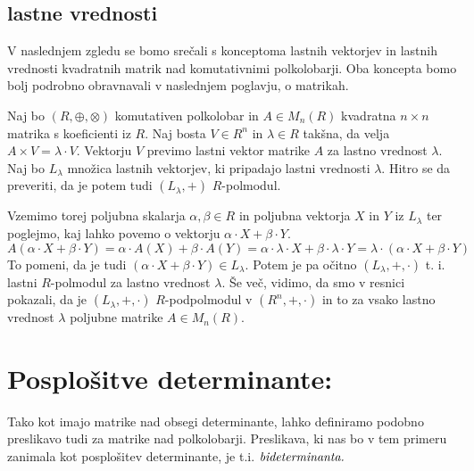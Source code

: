 \documentclass[mat1]{fmfdelo}
\newcommand{\pojem}[1]{\ensuremath{\emph{#1}}}
\begin{document}
\subsection{lastne vrednosti}
V naslednjem zgledu se bomo srečali s konceptoma lastnih vektorjev in lastnih vrednosti kvadratnih matrik nad komutativnimi polkolobarji. Oba koncepta bomo bolj podrobno obravnavali v naslednjem poglavju, o matrikah.
\begin{zgled}
	Naj bo $(R, \oplus, \otimes)$ komutativen polkolobar in $A\in M_n(R)$ kvadratna $n\times n$ matrika s koeficienti iz $R$. Naj bosta $V\in R^n$ in $\lambda\in R$ takšna, da velja $A \times V = \lambda \cdot V$. Vektorju $V$ previmo lastni vektor matrike $A$ za lastno vrednost $\lambda$. Naj bo $L_\lambda$ množica lastnih vektorjev, ki pripadajo lastni vrednosti $\lambda$. Hitro se da preveriti, da je potem tudi $(L_\lambda, +)$ $R$-polmodul.
	
	Vzemimo torej poljubna skalarja $\alpha, \beta\in R$ in poljubna vektorja $X$ in $Y$ iz $L_\lambda$ ter poglejmo, kaj lahko povemo o vektorju $\alpha\cdot X + \beta\cdot Y$. $$A(\alpha\cdot X + \beta\cdot Y) = \alpha\cdot A(X) + \beta\cdot A(Y) = \alpha\cdot\lambda\cdot X + \beta\cdot\lambda\cdot Y = \lambda\cdot (\alpha\cdot X + \beta\cdot Y)$$ To pomeni, da je tudi $(\alpha\cdot X + \beta\cdot Y)\in L_\lambda$. Potem je pa očitno $(L_\lambda, +, \cdot)$ t. i. lastni $R$-polmodul za lastno vrednost $\lambda$. Še več, vidimo, da smo v resnici pokazali, da je $(L_\lambda, +, \cdot)$ $R$-podpolmodul v $(R^n, +, \cdot)$ in to za vsako lastno vrednost $\lambda$ poljubne matrike $A\in M_n(R)$.
\end{zgled}

\section{Posplošitve determinante:}

Tako kot imajo matrike nad obsegi determinante, lahko definiramo podobno preslikavo tudi za matrike nad polkolobarji. Preslikava, ki nas bo v tem primeru zanimala kot posplošitev determinante, je t.i. \pojem{bideterminanta.}
\end{document}
